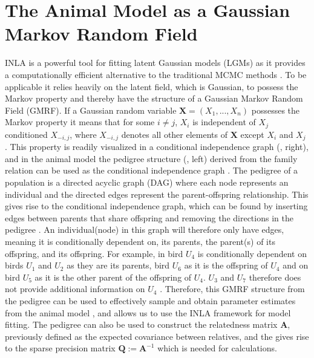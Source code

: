 \section{The Animal Model as a Gaussian Markov Random Field}
\label{sec:animalmodelGMRF}
INLA is a powerful tool for fitting latent Gaussian models (LGMs) as it provides a computationally efficient alternative to the traditional MCMC methods \citep{rue2009inla}.
To be applicable it relies heavily on the latent field, which is Gaussian, to possess the Markov property and thereby have the structure of a Gaussian Markov Random Field (GMRF). 
If a Gaussian random variable $\mathbf{X}=(X_1, ..., X_n)$ possesses the Markov property it means that for some $i\neq j$, $X_i$ is independent of $X_j$ conditioned $X_{-i, j}$, where $X_{-i, j}$ denotes all other elements of $\mathbf{X}$ except $X_i$ and $X_j$ \citep{rue2009inla}.
This property is readily visualized in a conditional independence graph (, right), and in the animal model the pedigree structure (, left) derived from the family relation can be used as the conditional independence graph \citep[as cited in \citet{Stensland_GMRF_bayes_animal_model}]{Wermuth1983Graphical}.
The pedigree of a population is a directed acyclic graph (DAG) where each node represents an individual and the directed edges represent the parent-offspring relationship. 
This gives rise to the conditional independence graph, which can be found by inserting edges between parents that share offspring and removing the directions in the pedigree \citep{Wermuth1983Graphical}.
An individual(node) in this graph will therefore only have edges, meaning it is conditionally dependent on, its parents, the parent(s) of its offspring, and its offspring. For example, in  bird $U_4$ is conditionally dependent on birds $U_1$ and $U_2$ as they are its parents, bird $U_6$ as it is the offspring of $U_4$ and on bird $U_5$ as it is the other parent of the offspring of $U_4$. $U_3$ and $U_7$ therefore does not provide additional information on $U_4$ \citep{Stensland_GMRF_bayes_animal_model}. Therefore, this GMRF structure from the pedigree can be used to effectively sample and obtain parameter estimates from the animal model \citep{Stensland_GMRF_bayes_animal_model}, and allows us to use the INLA framework for model fitting.
The pedigree can also be used to construct the relatedness matrix $\mathbf{A}$, previously defined as the expected covariance between relatives, and the gives rise to the sparse precision matrix $\mathbf{Q}:=\mathbf{A}^{-1}$ which is needed for calculations.
